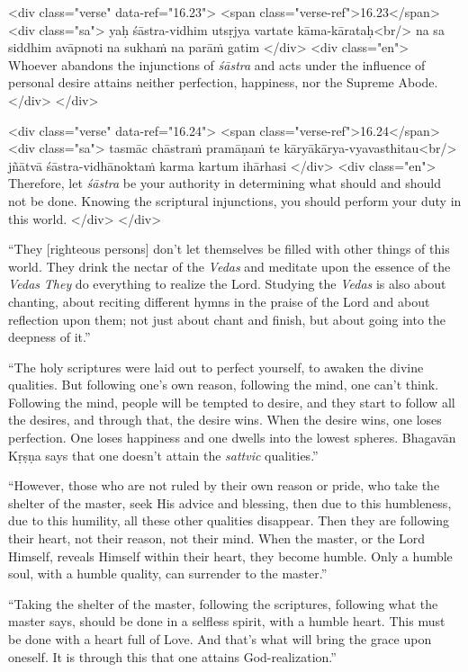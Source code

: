 \begin{html}
<div class="verse" data-ref="16.23">
  <span class="verse-ref">16.23</span>
  <div class="sa">
    yaḥ śāstra-vidhim utsṛjya vartate kāma-kārataḥ<br/>
    na sa siddhim avāpnoti na sukhaṁ na parāṁ gatim
  </div>
  <div class="en">
    Whoever abandons the injunctions of \textit{śāstra} and acts under the influence of personal desire attains neither perfection, happiness, nor the Supreme Abode.
  </div>
</div>
\end{html}



\begin{html}
<div class="verse" data-ref="16.24">
  <span class="verse-ref">16.24</span>
  <div class="sa">
    tasmāc chāstraṁ pramāṇaṁ te kāryākārya-vyavasthitau<br/>
    jñātvā śāstra-vidhānoktaṁ karma kartum ihārhasi
  </div>
  <div class="en">
    Therefore, let \textit{śāstra} be your authority in determining what should and should not be done. Knowing the scriptural injunctions, you should perform your duty in this world.
  </div>
</div>
\end{html}


\enquote{They [righteous persons] don’t let themselves be filled with other things of this world. They drink the nectar of the \textit{Vedas} and meditate upon the essence of the \textit{Vedas} \textit{They} do everything to realize the Lord. Studying the \textit{Vedas} is also about chanting, about reciting different hymns in the praise of the Lord and about reflection upon them; not just about chant and finish, but about going into the deepness of it.}

\enquote{The holy scriptures were laid out to perfect yourself, to awaken the divine qualities. But following one’s own reason, following the mind, one can’t think. Following the mind, people will be tempted to desire, and they start to follow all the desires, and through that, the desire wins. When the desire wins, one loses perfection. One loses happiness and one dwells into the lowest spheres. Bhagavān Kṛṣṇa says that one doesn’t attain the \textit{sattvic} qualities.}

\enquote{However, those who are not ruled by their own reason or pride, who take the shelter of the master, seek His advice and blessing, then due to this humbleness, due to this humility, all these other qualities disappear. Then they are following their heart, not their reason, not their mind. When the master, or the Lord Himself, reveals Himself within their heart, they become humble. Only a humble soul, with a humble quality, can surrender to the master.}

\enquote{Taking the shelter of the master, following the scriptures, following what the master says, should be done in a selfless spirit, with a humble heart. This must be done with a heart full of Love. And that’s what will bring the grace upon oneself. It is through this that one attains God-realization.}
